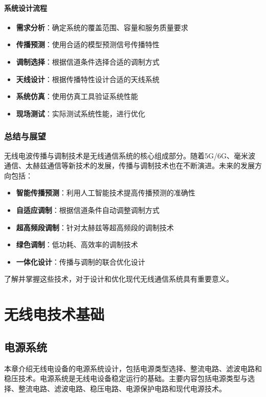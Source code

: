 \documentclass[12pt,UTF8]{ctexbook}
\begin{document}
\subsection{系统设计流程}
\begin{itemize}[leftmargin=3.5em]
    \item \textbf{需求分析}：确定系统的覆盖范围、容量和服务质量要求
    \item \textbf{传播预测}：使用合适的模型预测信号传播特性
    \item \textbf{调制选择}：根据信道条件选择合适的调制方式
    \item \textbf{天线设计}：根据传播特性设计合适的天线系统
    \item \textbf{系统仿真}：使用仿真工具验证系统性能
    \item \textbf{现场测试}：实际测试系统性能，进行优化
\end{itemize}

\section{总结与展望}

无线电波传播与调制技术是无线通信系统的核心组成部分。随着5G/6G、毫米波通信、太赫兹通信等新技术的发展，传播与调制技术也在不断演进。未来的发展方向包括：

\begin{itemize}[leftmargin=3.5em]
    \item \textbf{智能传播预测}：利用人工智能技术提高传播预测的准确性
    \item \textbf{自适应调制}：根据信道条件自动调整调制方式
    \item \textbf{超高频段调制}：针对太赫兹等超高频段的调制技术
    \item \textbf{绿色调制}：低功耗、高效率的调制技术
    \item \textbf{一体化设计}：传播与调制的联合优化设计
\end{itemize}

了解并掌握这些技术，对于设计和优化现代无线通信系统具有重要意义。

\part{无线电技术基础}

\chapter{电源系统}

本章介绍无线电设备的电源系统设计，包括电源类型选择、整流电路、滤波电路和稳压技术。电源系统是无线电设备稳定运行的基础。主要内容包括电源类型与选择、整流电路、滤波电路、稳压电路、电源保护电路和现代电源技术。
\end{document}
